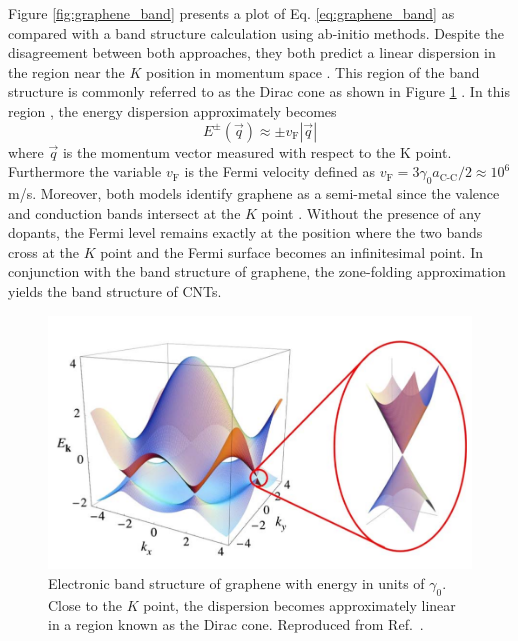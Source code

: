 %
Figure \ref{fig:graphene_band} presents a plot of Eq. \ref{eq:graphene_band} as compared with a band structure calculation using ab-initio methods. Despite the disagreement between both approaches, they both predict a linear dispersion in the region near the $K$ position in momentum space \cite{charlier2007electronic}. This region of the band structure is commonly referred to as the Dirac cone	as shown in Figure \ref{fig:dirac_cone} \cite{charlier2007electronic}. In this region , the energy dispersion approximately becomes
\begin{equation}
	\displaystyle E^{\pm}(\vec{q}) \approx \pm v_\text{F}|\vec{q}|
\end{equation}
where $\vec{q}$ is the momentum vector measured with respect to the K point. Furthermore the variable $v_\text{F}$ is the Fermi velocity defined as $v_\text{F} = 3 \gamma_0 a_\text{C-C}/2 \approx 10^6$ m/s. Moreover, both models identify graphene as a semi-metal since the valence and conduction bands intersect at the $K$ point \cite{charlier2007electronic}. Without the presence of any dopants, the Fermi level remains exactly at the position where the two bands cross at the $K$ point and the Fermi surface becomes an infinitesimal point. In conjunction with the band structure of graphene, the zone-folding approximation yields the band structure of CNTs.

\begin{figure}[ht]
	\centering
	\includegraphics[scale=0.4]{images/chapter_optical_props/dirac_cone}
	\caption{Electronic band structure of graphene with energy in units of $\gamma_0$. Close to the $K$ point, the dispersion becomes approximately linear in a region known as the Dirac cone. Reproduced from Ref.\ \cite{neto2009electronic}.}
	\label{fig:dirac_cone}
\end{figure}


